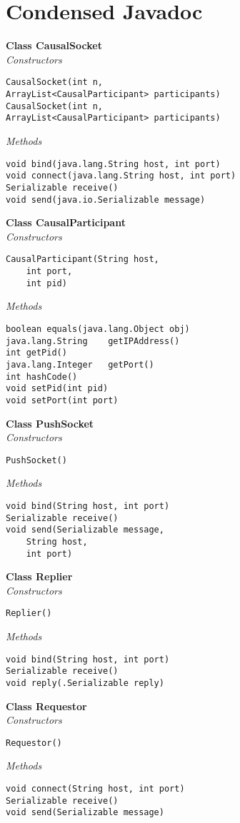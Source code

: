 \documentclass[10pt,journal,compsoc]{IEEEtran}
\begin{document}
\appendices
\section{Condensed Javadoc}

\textbf{Class CausalSocket}
\\
\emph{Constructors}
\begin{lstlisting}
CausalSocket(int n,
ArrayList<CausalParticipant> participants)
CausalSocket(int n,
ArrayList<CausalParticipant> participants) 
\end{lstlisting}

\emph{Methods}
\begin{lstlisting}
void bind(java.lang.String host, int port)
void connect(java.lang.String host, int port) 
Serializable receive() 
void send(java.io.Serializable message) 

\end{lstlisting}
\textbf{Class CausalParticipant}
\\
\emph{Constructors}
\begin{lstlisting}
CausalParticipant(String host, 
    int port, 
    int pid) 
\end{lstlisting}
\emph{Methods}
\begin{lstlisting}
boolean	equals(java.lang.Object obj) 
java.lang.String	getIPAddress() 
int	getPid() 
java.lang.Integer	getPort() 
int	hashCode() 
void setPid(int pid) 
void setPort(int port) 

\end{lstlisting}
\textbf{Class PushSocket}
\\
\emph{Constructors}
\begin{lstlisting}
PushSocket() 
\end{lstlisting}
\emph{Methods}
\begin{lstlisting}
void bind(String host, int port)
Serializable receive() 
void send(Serializable message, 
    String host, 
    int port) 

\end{lstlisting}
\textbf{Class Replier}
\\
\emph{Constructors}
\begin{lstlisting}
Replier() 
\end{lstlisting}
\emph{Methods}
\begin{lstlisting}
void bind(String host, int port)
Serializable receive() 
void reply(.Serializable reply) 

\end{lstlisting}
\textbf{Class Requestor}
\\
\emph{Constructors}
\begin{lstlisting}
Requestor() 
\end{lstlisting}
\emph{Methods}
\begin{lstlisting}
void connect(String host, int port) 
Serializable receive() 
void send(Serializable message) 

\end{lstlisting}
\end{document}
